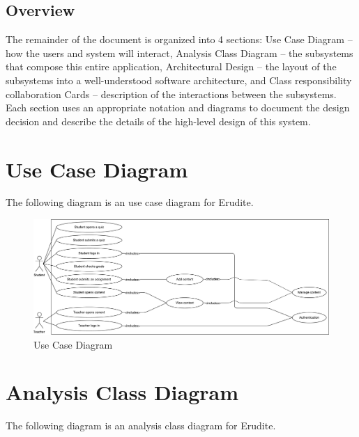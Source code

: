 \documentclass[]{article}
\begin{document}
\subsection{Overview}
\label{sub:overview}
The remainder of the document is organized into 4 sections: Use Case Diagram --
how the users and system will interact, Analysis Class Diagram -- the
subsystems that compose this entire application, Architectural Design -- the
layout of the subsystems into a well-understood software architecture, and
Class responsibility collaboration Cards -- description of the interactions
between the subsystems. Each section uses an appropriate notation and diagrams
to document the design decision and describe the details of the high-level
design of this system.




\newpage

\section{Use Case Diagram}
\label{sec:use_case_diagram}
The following diagram is an use case diagram for Erudite.\\

{
\begin{figure}[h]
  \centering
  \includegraphics[scale=0.40]{A2_Assets/use_case_diagram.pdf}
  \caption{Use Case Diagram}
\end{figure}
}

\newpage

\section{Analysis Class Diagram}
\label{sec:analysis_class_diagram}
The following diagram is an analysis class diagram for Erudite.\\
\end{document}

